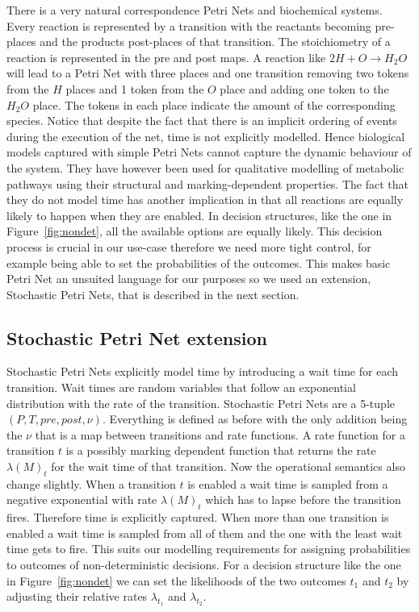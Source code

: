 There is a very natural correspondence Petri Nets and biochemical
systems. Every reaction is represented by a transition with the
reactants becoming pre-places and the products post-places of that
transition. The stoichiometry of a reaction is represented in the
pre and post maps. A reaction like $2H + O \rightarrow H_2O$ will lead
to a Petri Net with three places and one transition removing two
tokens from the $H$ places and 1 token from the $O$ place and adding
one token to the $H_2O$ place. The tokens in each place indicate the
amount of the corresponding species. Notice that despite the
fact that there is an implicit ordering of events during the execution
of the net, time is not explicitly modelled. Hence biological models
captured with simple Petri Nets cannot capture the dynamic behaviour
of the system. They have however been used for qualitative modelling
of metabolic pathways using their structural and
marking-dependent properties. The fact that they do not model time has
another implication in that all reactions are equally likely to
happen when they are enabled. In decision structures, like the one in
Figure~\ref{fig:nondet}, all the available options are equally
likely. This decision process is crucial in our use-case therefore we
need more tight control, for example being able to set the
probabilities of the outcomes. This makes basic Petri Net an unsuited
language for our purposes so we used an extension, Stochastic Petri
Nets, that is described in the next section.

\subsection{Stochastic Petri Net extension}
Stochastic Petri Nets explicitly model time by introducing a wait time
for each transition. Wait times are random variables that follow an
exponential distribution with the rate of the transition. Stochastic
Petri Nets are a 5-tuple $(P, T, pre, post, \nu)$. Everything is
defined as before with the only addition being the $\nu$ that is a
map between transitions and rate functions. A rate function for a
transition $t$ is a
possibly marking dependent function that returns the rate
$\lambda(M)_t$ for the wait time of that transition. Now the
operational semantics also change slightly. When a transition $t$ is
enabled a wait time is sampled from a negative exponential with rate
$\lambda(M)_t$ which has to lapse before the transition
fires. Therefore time is explicitly captured. When more than one
transition is enabled a wait time is sampled from all of them and the
one with the least wait time gets to fire. This suits our modelling
requirements for assigning probabilities to outcomes of
non-deterministic decisions. For a decision structure like the one in
Figure~\ref{fig:nondet} we can set the likelihoods of the two outcomes
$t_1$ and $t_2$ by adjusting their relative rates $\lambda_{t_1}$ and
$\lambda_{t_2}$. 

